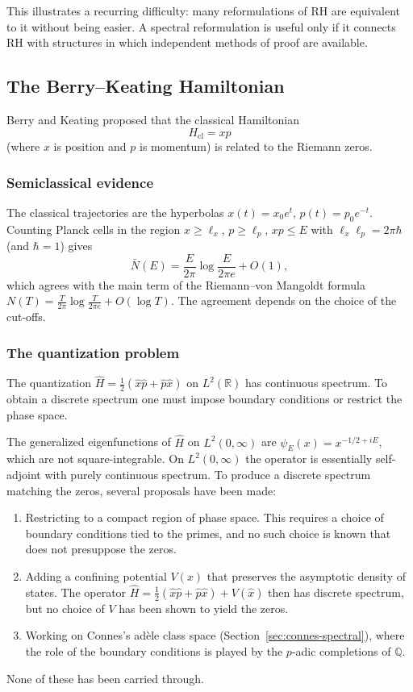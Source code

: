 \documentclass[11pt]{amsart}
\theoremstyle{definition}
\theoremstyle{remark}
\begin{document}
This illustrates a recurring difficulty: many reformulations of RH are equivalent to it without being easier. A spectral reformulation is useful only if it connects RH with structures in which independent methods of proof are available.

\subsection{The Berry--Keating Hamiltonian}\label{sec:bk}

Berry and Keating \cite{berry1999} proposed that the classical Hamiltonian
\[
H_{\mathrm{cl}} = xp
\]
(where $x$ is position and $p$ is momentum) is related to the Riemann zeros.

\subsubsection{Semiclassical evidence}

The classical trajectories are the hyperbolas $x(t) = x_0 e^t$, $p(t) = p_0 e^{-t}$. Counting Planck cells in the region $x\ge\ell_x$, $p\ge\ell_p$, $xp\le E$ with $\ell_x\ell_p=2\pi\hbar$ (and $\hbar=1$) gives
\[
\bar{N}(E) = \frac{E}{2\pi}\log\frac{E}{2\pi e}+O(1),
\]
which agrees with the main term of the Riemann--von Mangoldt formula $N(T) = \frac{T}{2\pi}\log\frac{T}{2\pi e} + O(\log T)$. The agreement depends on the choice of the cut-offs.

\subsubsection{The quantization problem}

The quantization $\hat{H} = \frac{1}{2}(\hat{x}\hat{p} + \hat{p}\hat{x})$ on $L^2(\mathbb{R})$ has continuous spectrum. To obtain a discrete spectrum one must impose boundary conditions or restrict the phase space.

The generalized eigenfunctions of $\hat{H}$ on $L^2(0,\infty)$ are $\psi_E(x) = x^{-1/2 + iE}$, which are not square-integrable. On $L^2(0,\infty)$ the operator is essentially self-adjoint with purely continuous spectrum. To produce a discrete spectrum matching the zeros, several proposals have been made:
\begin{enumerate}[label=(\roman*)]
\item Restricting to a compact region of phase space. This requires a choice of boundary conditions tied to the primes, and no such choice is known that does not presuppose the zeros.
\item Adding a confining potential $V(x)$ that preserves the asymptotic density of states. The operator $\hat{H} = \frac{1}{2}(\hat{x}\hat{p} + \hat{p}\hat{x}) + V(\hat{x})$ then has discrete spectrum, but no choice of $V$ has been shown to yield the zeros.
\item Working on Connes's ad\`ele class space (Section~\ref{sec:connes-spectral}), where the role of the boundary conditions is played by the $p$-adic completions of $\mathbb{Q}$.
\end{enumerate}
None of these has been carried through.
\end{document}
